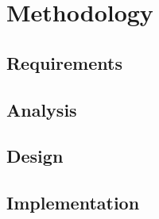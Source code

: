 \chapter{Methodology}

\lipsum  %


\section{Requirements}

\lipsum  %


\section{Analysis}

\lipsum  %


\section{Design}

\lipsum  %


\section{Implementation}

\lipsum  %
